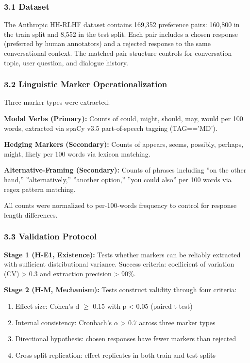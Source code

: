 
\subsubsection{3.1 Dataset}

The Anthropic HH-RLHF dataset \citep{bai2022training} contains 169,352 preference pairs: 160,800 in the train split and 8,552 in the test split. Each pair includes a chosen response (preferred by human annotators) and a rejected response to the same conversational context. The matched-pair structure controls for conversation topic, user question, and dialogue history.

\subsubsection{3.2 Linguistic Marker Operationalization}

Three marker types were extracted:

\textbf{Modal Verbs (Primary):} Counts of could, might, should, may, would per 100 words, extracted via spaCy v3.5 part-of-speech tagging (TAG=='MD').

\textbf{Hedging Markers (Secondary):} Counts of appears, seems, possibly, perhaps, might, likely per 100 words via lexicon matching.

\textbf{Alternative-Framing (Secondary):} Counts of phrases including ''on the other hand,'' ''alternatively,'' ''another option,'' ''you could also'' per 100 words via regex pattern matching.

All counts were normalized to per-100-words frequency to control for response length differences.

\subsubsection{3.3 Validation Protocol}

\textbf{Stage 1 (H-E1, Existence):} Tests whether markers can be reliably extracted with sufficient distributional variance. Success criteria: coefficient of variation (CV) > 0.3 and extraction precision > 90\%.

\textbf{Stage 2 (H-M, Mechanism):} Tests construct validity through four criteria:
\begin{enumerate}
\item Effect size: Cohen's d $\geq$ 0.15 with p < 0.05 (paired t-test)
\item Internal consistency: Cronbach's $\alpha$ > 0.7 across three marker types
\item Directional hypothesis: chosen responses have fewer markers than rejected
\item Cross-split replication: effect replicates in both train and test splits
\end{enumerate}

